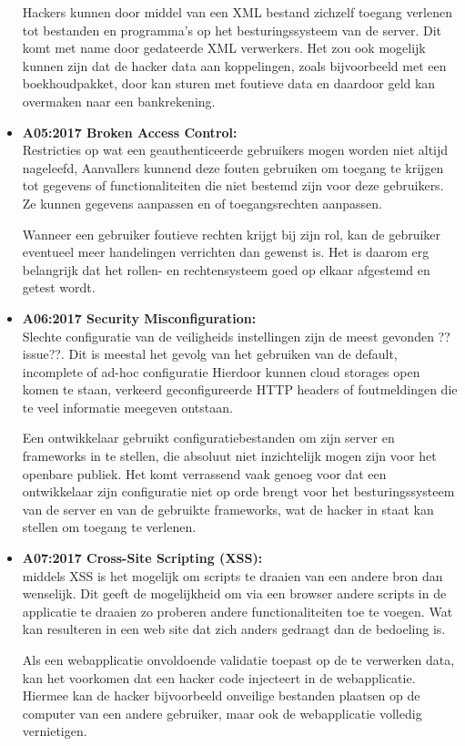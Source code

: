 \begin{itemize}
Hackers kunnen door middel van een XML bestand zichzelf toegang verlenen tot bestanden en programma’s op het besturingssysteem van de server. Dit komt met name door gedateerde XML verwerkers. Het zou ook mogelijk kunnen zijn dat de hacker data aan koppelingen, zoals bijvoorbeeld met een boekhoudpakket, door kan sturen met foutieve data en daardoor geld kan overmaken naar een bankrekening.


\item \textbf{A05:2017 Broken Access Control:}\\
Restricties op wat een geauthenticeerde gebruikers mogen worden niet altijd nageleefd, Aanvallers kunnend deze fouten gebruiken om toegang te krijgen tot gegevens of functionaliteiten die niet bestemd zijn voor deze gebruikers. Ze kunnen gegevens aanpassen en of toegangsrechten aanpassen.

Wanneer een gebruiker foutieve rechten krijgt bij zijn rol, kan de gebruiker eventueel meer handelingen verrichten dan gewenst is. Het is daarom erg belangrijk dat het rollen- en rechtensysteem goed op elkaar afgestemd en getest wordt.

\item \textbf{A06:2017 Security Misconfiguration:}\\
Slechte configuratie van de veiligheids instellingen zijn de meest gevonden ??issue??. Dit is meestal het gevolg van het gebruiken van de default, incomplete of ad-hoc configuratie Hierdoor kunnen cloud storages open komen te staan, verkeerd geconfigureerde HTTP headers of foutmeldingen die te veel informatie meegeven ontstaan.

Een ontwikkelaar gebruikt configuratiebestanden om zijn server en frameworks in te stellen, die absoluut niet inzichtelijk mogen zijn voor het openbare publiek. Het komt verrassend vaak genoeg voor dat een ontwikkelaar zijn configuratie niet op orde brengt voor het besturingssysteem van de server en van de gebruikte frameworks, wat de hacker in staat kan stellen om toegang te verlenen.


\item \textbf{A07:2017 Cross-Site Scripting (XSS):}\\ middels XSS is het mogelijk om scripts te draaien van een andere bron dan wenselijk. Dit geeft de mogelijkheid om via een browser andere scripts in de applicatie te draaien zo proberen andere functionaliteiten toe te voegen. Wat kan resulteren in een web site dat zich anders gedraagt dan de bedoeling is.

Als een webapplicatie onvoldoende validatie toepast op de te verwerken data, kan het voorkomen dat een hacker code injecteert in de webapplicatie. Hiermee kan de hacker bijvoorbeeld onveilige bestanden plaatsen op de computer van een andere gebruiker, maar ook de webapplicatie volledig vernietigen.


\end{itemize}
